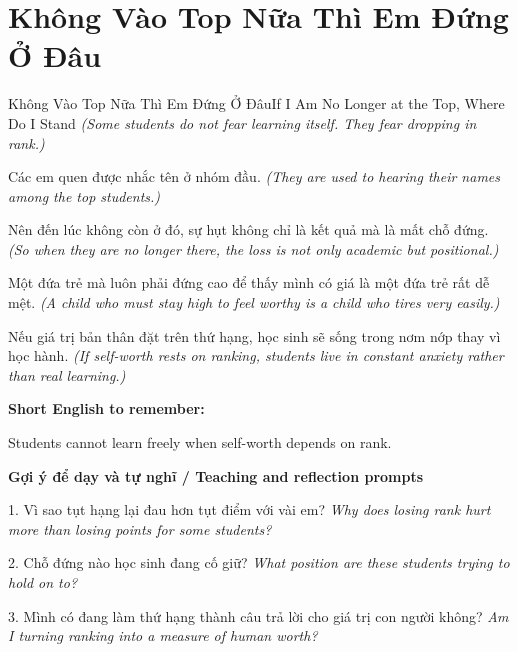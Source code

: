 \section{Không Vào Top Nữa Thì Em Đứng Ở Đâu}
\begin{truyen}{Không Vào Top Nữa Thì Em Đứng Ở Đâu}{If I Am No Longer at the Top, Where Do I Stand}
\textit{(Some students do not fear learning itself. They fear dropping in rank.)}

Các em quen được nhắc tên ở nhóm đầu.
\textit{(They are used to hearing their names among the top students.)}

Nên đến lúc không còn ở đó, sự hụt không chỉ là kết quả mà là mất chỗ đứng.
\textit{(So when they are no longer there, the loss is not only academic but positional.)}

Một đứa trẻ mà luôn phải đứng cao để thấy mình có giá là một đứa trẻ rất dễ mệt.
\textit{(A child who must stay high to feel worthy is a child who tires very easily.)}

\end{truyen}

\begin{baihoc}
Nếu giá trị bản thân đặt trên thứ hạng, học sinh sẽ sống trong nơm nớp thay vì học hành.
\textit{(If self-worth rests on ranking, students live in constant anxiety rather than real learning.)}
\end{baihoc}

\begin{ghinhoanh}
\textbf{Short English to remember:}

Students cannot learn freely when self-worth depends on rank.

\end{ghinhoanh}

\begin{tuhocnhanh}
\textbf{Gợi ý để dạy và tự nghĩ / Teaching and reflection prompts}

1. Vì sao tụt hạng lại đau hơn tụt điểm với vài em? \textit{Why does losing rank hurt more than losing points for some students?}

2. Chỗ đứng nào học sinh đang cố giữ? \textit{What position are these students trying to hold on to?}

3. Mình có đang làm thứ hạng thành câu trả lời cho giá trị con người không? \textit{Am I turning ranking into a measure of human worth?}
\end{tuhocnhanh}
\ngancach

